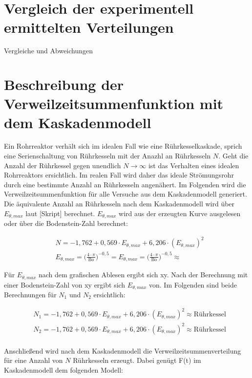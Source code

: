 \documentclass[12pt,liststotoc]{report}
\begin{document}

\section{Vergleich der experimentell ermittelten Verteilungen}

Vergleiche und Abweichungen



\section{Beschreibung der Verweilzeitsummenfunktion mit dem Kaskadenmodell}


Ein Rohrreaktor verhält sich im idealen Fall wie eine Rührkesselkaskade, sprich eine Serienschaltung von Rührkesseln mit der Anazhl an Rührkesseln $N$. Geht die Anzahl der Rührkessel gegen unendlich $N \rightarrow \infty$ ist das Verhalten eines idealen Rohrreaktors ersichtlich. Im realen Fall wird daher das ideale Strömungsrohr durch eine bestimmte Anzahl an Rührkesseln angenähert. Im Folgenden wird die Verweilzeitsummenfunktion für alle Versuche aus dem Kaskadenmodell generiert. Die äquivalente Anzahl an Rührkesseln nach dem Kaskadenmodell wird über $E_{\theta,max}$ laut [Skript] berechnet. $E_{\theta,max}$ wird aus der erzeugten Kurve ausgelesen oder über die Bodenstein-Zahl berechnet:

\begin{align}
&N = -1,762 + 0,569\cdot E_{\theta,max} + 6,206\cdot (E_{\theta,max})^2\\
&E_{\theta,max}=\biggl(\frac{4\cdot\pi}{\text{Bo}}\biggl)^{-0,5} = E_{\theta,max}=\biggl(\frac{4\cdot\pi}{\text{Bo}}\biggl)^{-0,5} \approx 
\end{align}

Für $E_{\theta,max}$ nach dem grafischen Ablesen ergibt sich xy. Nach der Berechnung mit einer Bodenstein-Zahl von xy ergibt sich $E_{\theta,max}$ von. Im Folgenden sind beide Berechnungen für $N_1$ und $N_2$ ersichtlich:

\begin{align*}
&N_1 = -1,762 + 0,569\cdot E_{\theta,max} + 6,206\cdot (E_{\theta,max})^2\approx \text{Rührkessel}\\
&N_2 = -1,762 + 0,569\cdot E_{\theta,max} + 6,206\cdot (E_{\theta,max})^2\approx  \text{Rührkessel}\\
\end{align*}

Anschließend wird nach dem Kaskadenmodell die Verweilzeitsummenverteilung für eine Anzahl von $N$ Rührkesseln erzeugt. Dabei genügt F(t) im Kaskadenmodell dem folgenden Modell:
\end{document}
